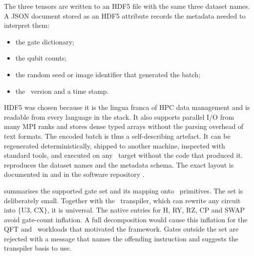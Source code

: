 The three tensors are written to an HDF5 file with the same three dataset names. A JSON document stored as an HDF5 attribute records the metadata needed to interpret them:
\begin{itemize}
  \item the gate dictionary;
  \item the qubit counts;
  \item the random seed or image identifier that generated the batch;
  \item the \qiskit\ version and a time stamp.
\end{itemize}
HDF5 was chosen because it is the lingua franca of HPC data management and is readable from every language in the stack. It also supports parallel I/O from many MPI ranks and stores dense typed arrays without the parsing overhead of text formats. The encoded batch is thus a self-describing artefact. It can be regenerated deterministically, shipped to another machine, inspected with standard tools, and executed on any \cudaq\ target without the code that produced it.  reproduces the dataset names and the metadata schema. The exact layout is documented in \cite{guo2025qgear} and in the software repository \cite{guo2025qgearsoftware}.

 summarises the supported gate set and its mapping onto \cudaq\ primitives. The set is deliberately small. Together with the \qiskit\ transpiler, which can rewrite any circuit into $\{$U3, CX$\}$, it is universal. The native entries for H, RY, RZ, CP and SWAP avoid gate-count inflation. A full decomposition would cause this inflation for the QFT and \qcrank\ workloads that motivated the framework. Gates outside the set are rejected with a message that names the offending instruction and suggests the transpiler basis to use.

